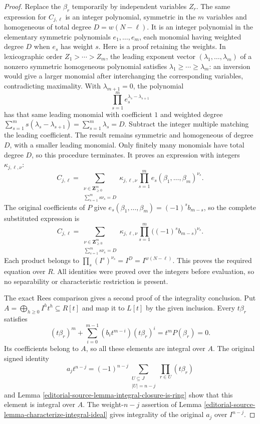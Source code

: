 \begin{proof}
Replace the $\beta_r$ temporarily by independent variables
$Z_r$. The same expression for $C_{j,\ell}$ is an integer
polynomial, symmetric in the $m$ variables and homogeneous of
total degree $D=w(N-\ell)$. It is an integer polynomial in
the elementary symmetric polynomials $e_1,\ldots,e_m$, each
monomial having weighted degree $D$ when $e_s$ has weight $s$.
Here is a proof retaining the weights. In lexicographic order
$Z_1>\cdots>Z_m$, the leading exponent vector
$(\lambda_1,\ldots,\lambda_m)$ of a nonzero symmetric
homogeneous polynomial satisfies
$\lambda_1\geq\cdots\geq\lambda_m$: an inversion would give
a larger monomial after interchanging the corresponding
variables, contradicting maximality. With $\lambda_{m+1}=0$,
the polynomial
$$
\prod_{s=1}^m e_s^{\lambda_s-\lambda_{s+1}}
$$
has that same leading monomial with coefficient $1$ and
weighted degree
$\sum_{s=1}^m s(\lambda_s-\lambda_{s+1})
=\sum_{s=1}^m\lambda_s=D$.
Subtract the integer multiple matching the leading coefficient.
The result remains symmetric and homogeneous of degree $D$,
with a smaller leading monomial. Only finitely many monomials
have total degree $D$, so this procedure terminates. It proves
an expression with integers $\kappa_{j,\ell,\nu}$:
$$
C_{j,\ell}
=\sum_{\substack{\nu\in\mathbf Z_{\geq0}^m\\
                  \sum_{s=1}^m s\nu_s=D}}
\kappa_{j,\ell,\nu}
\prod_{s=1}^m e_s(\beta_1,\ldots,\beta_m)^{\nu_s}.
$$
The original coefficients of $P$ give
$e_s(\beta_1,\ldots,\beta_m)=(-1)^s b_{m-s}$, so the
complete substituted expression is
$$
C_{j,\ell}
=\sum_{\substack{\nu\in\mathbf Z_{\geq0}^m\\
                  \sum_{s=1}^m s\nu_s=D}}
\kappa_{j,\ell,\nu}
\prod_{s=1}^m\bigl((-1)^s b_{m-s}\bigr)^{\nu_s}.
$$
Each product belongs to
$\prod_s(I^s)^{\nu_s}=I^D=I^{w(N-\ell)}$.
This proves the required equation over $R$. All identities
were proved over the integers before evaluation, so no
separability or characteristic restriction is present.

The exact Rees comparison gives a second proof of the
integrality conclusion. Put
$A=\bigoplus_{h\geq0}I^ht^h\subseteq R[t]$ and map it to
$L[t]$ by the given inclusion. Every $t\beta_r$ satisfies
$$
(t\beta_r)^m+
\sum_{i=0}^{m-1}(b_it^{m-i})(t\beta_r)^i=t^mP(\beta_r)=0.
$$
Its coefficients belong to $A$, so all these elements are
integral over $A$. The original signed identity
$$
a_jt^{n-j}=(-1)^{n-j}
\sum_{\substack{U\subseteq J\\|U|=n-j}}
\prod_{r\in U}(t\beta_r)
$$
and Lemma \ref{editorial-source-lemma-integral-closure-is-ring} show that this
element is integral over $A$. The weight-$n-j$ assertion of
Lemma \ref{editorial-source-lemma-characterize-integral-ideal} gives integrality
of the original $a_j$ over $I^{n-j}$.
\end{proof}

